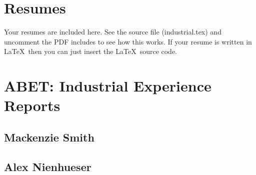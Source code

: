 


\section{Resumes}

Your resumes are included here.  See the source file (industrial.tex) and uncomment the PDF includes to see how this works.  If your resume is written in \LaTeX\ then you can just insert the \LaTeX\ source code.


     
     
%     

\section{ABET:  Industrial Experience Reports}

\subsection{Mackenzie Smith}

% 

\subsection{Alex Nienhueser}

% 




